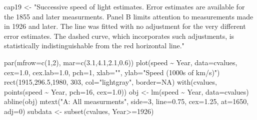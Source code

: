 \documentclass[
  10pt,
  b5paper]{book}
\newenvironment{Shaded}{\begin{snugshade}}{\end{snugshade}}
\newcommand{\AttributeTok}[1]{\textcolor[rgb]{0.77,0.63,0.00}{#1}}
\newcommand{\ConstantTok}[1]{\textcolor[rgb]{0.00,0.00,0.00}{#1}}
\newcommand{\DecValTok}[1]{\textcolor[rgb]{0.00,0.00,0.81}{#1}}
\newcommand{\FloatTok}[1]{\textcolor[rgb]{0.00,0.00,0.81}{#1}}
\newcommand{\FunctionTok}[1]{\textcolor[rgb]{0.00,0.00,0.00}{#1}}
\newcommand{\NormalTok}[1]{#1}
\newcommand{\OtherTok}[1]{\textcolor[rgb]{0.56,0.35,0.01}{#1}}
\newcommand{\SpecialCharTok}[1]{\textcolor[rgb]{0.00,0.00,0.00}{#1}}
\newcommand{\StringTok}[1]{\textcolor[rgb]{0.31,0.60,0.02}{#1}}
\begin{document}
\begin{Shaded}
\begin{Highlighting}[]
\NormalTok{cap19 }\OtherTok{\textless{}{-}} \StringTok{"Successive speed of light estimates.}
\StringTok{Error estimates are available for the 1855 and later}
\StringTok{measurments.  Panel B limits attention to measurements}
\StringTok{made in 1926 and later. The line }
\StringTok{was fitted with no adjustment for the very different error}
\StringTok{estimates.  The dashed curve, which incorporates}
\StringTok{such adjustments, is statistically indistinguishable}
\StringTok{from the red horizontal line."}
\end{Highlighting}
\end{Shaded}

\begin{Shaded}
\begin{Highlighting}[]
\FunctionTok{par}\NormalTok{(}\AttributeTok{mfrow=}\FunctionTok{c}\NormalTok{(}\DecValTok{1}\NormalTok{,}\DecValTok{2}\NormalTok{), }\AttributeTok{mar=}\FunctionTok{c}\NormalTok{(}\FloatTok{3.1}\NormalTok{,}\FloatTok{4.1}\NormalTok{,}\FloatTok{2.1}\NormalTok{,}\FloatTok{0.6}\NormalTok{))}
\FunctionTok{plot}\NormalTok{(speed }\SpecialCharTok{\textasciitilde{}}\NormalTok{ Year, }\AttributeTok{data=}\NormalTok{cvalues, }\AttributeTok{cex=}\FloatTok{1.0}\NormalTok{, }\AttributeTok{cex.lab=}\FloatTok{1.0}\NormalTok{, }\AttributeTok{pch=}\DecValTok{1}\NormalTok{,}
     \AttributeTok{xlab=}\StringTok{""}\NormalTok{, }\AttributeTok{ylab=}\StringTok{"Speed (1000s of km/s)"}\NormalTok{)}
\FunctionTok{rect}\NormalTok{(}\DecValTok{1915}\NormalTok{,}\FloatTok{296.5}\NormalTok{,}\DecValTok{1980}\NormalTok{, }\DecValTok{303}\NormalTok{, }\AttributeTok{col=}\StringTok{"lightgray"}\NormalTok{, }\AttributeTok{border=}\ConstantTok{NA}\NormalTok{)}
\FunctionTok{with}\NormalTok{(cvalues, }\FunctionTok{points}\NormalTok{(speed }\SpecialCharTok{\textasciitilde{}}\NormalTok{ Year, }\AttributeTok{pch=}\DecValTok{16}\NormalTok{, }\AttributeTok{cex=}\FloatTok{1.0}\NormalTok{))}
\NormalTok{obj }\OtherTok{\textless{}{-}} \FunctionTok{lm}\NormalTok{(speed }\SpecialCharTok{\textasciitilde{}}\NormalTok{ Year, }\AttributeTok{data=}\NormalTok{cvalues)}
\FunctionTok{abline}\NormalTok{(obj)}
\FunctionTok{mtext}\NormalTok{(}\StringTok{"A: All measurments"}\NormalTok{, }\AttributeTok{side=}\DecValTok{3}\NormalTok{, }\AttributeTok{line=}\FloatTok{0.75}\NormalTok{, }\AttributeTok{cex=}\FloatTok{1.25}\NormalTok{, }\AttributeTok{at=}\DecValTok{1650}\NormalTok{, }\AttributeTok{adj=}\DecValTok{0}\NormalTok{)}
\NormalTok{subdata }\OtherTok{\textless{}{-}} \FunctionTok{subset}\NormalTok{(cvalues, Year}\SpecialCharTok{\textgreater{}=}\DecValTok{1926}\NormalTok{)}

\end{Highlighting}
\end{Shaded}
\end{document}
